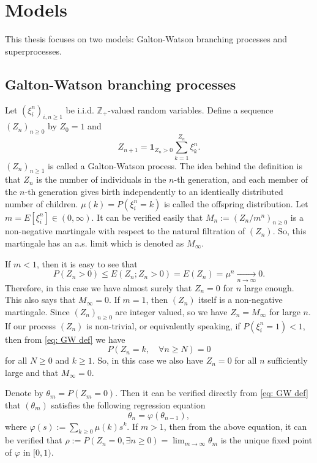\documentclass[UTF8]{pkuthss}
\theoremstyle{plain}
\theoremstyle{definition}
\numberwithin{equation}{section}
\begin{document}
\section{Models}
\label{sec:model}
	
	This thesis focuses on two models: Galton-Watson branching processes and superprocesses.
\subsection{Galton-Watson branching processes}
	Let $(\xi_i^n)_{i,n\geq 1}$ be i.i.d. $\mathbb Z_+$-valued random variables. 
	Define a sequence $(Z_n)_{n\geq 0}$ by $Z_0 = 1$ and 
\begin{equation}
\label{eq: GW def}
	Z_{n+1} = \mathbf 1_{Z_n>0}\sum_{k=1}^{Z_n} \xi_k^{n}.
\end{equation}
	$(Z_n)_{n\geq 1}$ is called a Galton-Watson process. 
	The idea behind the definition is that $Z_n$ is the number of individuals in the $n$-th generation, and each member of the $n$-th generation gives birth independently to an identically distributed number of children. 
	$\mu(k)=P(\xi_i^n=k)$ is called the offspring distribution. Let $m = E[\xi_i^n]\in (0,\infty)$. It can be verified easily that $M_n:=(Z_n/m^n)_{n\geq 0}$ is a non-negative martingale with respect to the natural filtration of $(Z_n)$.
	So, this martingale has an a.s. limit which is denoted as $M_\infty$.

	If $m < 1$, then it is easy to see that
\[
	P(Z_n > 0) \leq E(Z_n; Z_n>0) = E(Z_n) = \mu^n \xrightarrow[n\to \infty]{} 0.
\]
	Therefore, in this case we have almost surely that $Z_n = 0$ for $n$ large enough. This also says that $M_\infty = 0$.
	If $m = 1$, then $(Z_n)$ itself is a non-negative martingale. Since $(Z_n)_{n\geq 0}$ are integer valued, so we have $Z_n = M_\infty$ for large $n$. 
	If our process $(Z_n)$ is non-trivial, or equivalently speaking, if $P(\xi_i^n = 1)<1$, then from \eqref{eq: GW def} we have
\[
	P(Z_n = k,\quad \forall n \geq N) = 0
\]
	for all $N\geq 0$ and $k \geq 1$. So, in this case we also have $Z_n = 0$ for all $n$ sufficiently large and that $M_\infty = 0$.

	Denote by $\theta_m = P(Z_m = 0)$. Then it can be verified directly from \eqref{eq: GW def} that $(\theta_m)$ satisfies the following regression equation
\[
	\theta_n = \varphi(\theta_{n-1}),
\]
	where $\varphi(s):= \sum_{k\geq 0} \mu(k) s^k$.
	If $m > 1$, then from the above equation, it can be verified that $\rho := P(Z_n = 0, \exists n \geq 0)= \lim_{m\to \infty} \theta_m$ is the unique fixed point of $\varphi$ in $[0,1)$.
\end{document}
